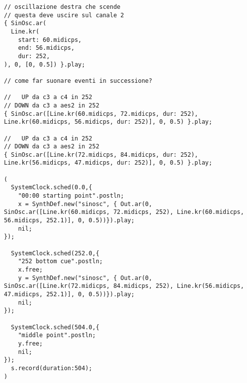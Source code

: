 \begin{multicols}{2}
\begin{lstlisting}[style=SuperCollider-IDE]
// oscillazione destra che scende
// questa deve uscire sul canale 2
{ SinOsc.ar(
  Line.kr(
    start: 60.midicps,
    end: 56.midicps,
    dur: 252,
), 0, [0, 0.5]) }.play;

// come far suonare eventi in successione?

//   UP da c3 a c4 in 252
// DOWN da c3 a aes2 in 252
{ SinOsc.ar([Line.kr(60.midicps, 72.midicps, dur: 252), Line.kr(60.midicps, 56.midicps, dur: 252)], 0, 0.5) }.play;

//   UP da c3 a c4 in 252
// DOWN da c3 a aes2 in 252
{ SinOsc.ar([Line.kr(72.midicps, 84.midicps, dur: 252), Line.kr(56.midicps, 47.midicps, dur: 252)], 0, 0.5) }.play;

(
  SystemClock.sched(0.0,{
    "00:00 starting point".postln;
    x = SynthDef.new("sinosc", { Out.ar(0, SinOsc.ar([Line.kr(60.midicps, 72.midicps, 252), Line.kr(60.midicps, 56.midicps, 252.1)], 0, 0.5))}).play;
    nil;
});

  SystemClock.sched(252.0,{
    "252 bottom cue".postln;
    x.free;
    y = SynthDef.new("sinosc", { Out.ar(0, SinOsc.ar([Line.kr(72.midicps, 84.midicps, 252), Line.kr(56.midicps, 47.midicps, 252.1)], 0, 0.5))}).play;
    nil;
});

  SystemClock.sched(504.0,{
    "middle point".postln;
    y.free;
    nil;
});
  s.record(duration:504);
)
\end{lstlisting}

\end{multicols}
